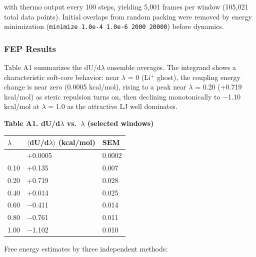 \documentclass[
  11pt,
]{article}
\newcounter{none} %
\begin{document}
with thermo output every 100 steps, yielding 5,001 frames per window
(105,021 total data points). Initial overlaps from random packing were
removed by energy minimization
(\texttt{minimize\ 1.0e-4\ 1.0e-6\ 2000\ 20000}) before dynamics.

\subsubsection{FEP Results}\label{fep-results}

Table A1 summarizes the dU/d\(\lambda\) ensemble averages. The integrand
shows a characteristic soft-core behavior: near \(\lambda\) = 0
(Li\(^{+}\) ghost), the coupling energy change is near zero (0.0005
kcal/mol), rising to a peak near \(\lambda\) = 0.20 (+0.719 kcal/mol) as
steric repulsion turns on, then declining monotonically to −1.10
kcal/mol at \(\lambda\) = 1.0 as the attractive LJ well dominates.

\textbf{Table A1. dU/d\(\lambda\) vs.~\(\lambda\) (selected windows)}

{\def\LTcaptype{none} %
\begin{longtable}[]{@{}lll@{}}
\toprule\noalign{}
\(\lambda\) & \(\langle\)dU/d\(\lambda\)\(\rangle\) (kcal/mol) & SEM \\
\midrule\noalign{}
\endhead
\bottomrule\noalign{}
\endlastfoot
0.00 & +0.0005 & 0.0002 \\
0.10 & +0.135 & 0.007 \\
0.20 & +0.719 & 0.028 \\
0.40 & +0.014 & 0.025 \\
0.60 & −0.411 & 0.014 \\
0.80 & −0.761 & 0.011 \\
1.00 & −1.102 & 0.010 \\
\end{longtable}
}

Free energy estimates by three independent methods:
\end{document}

